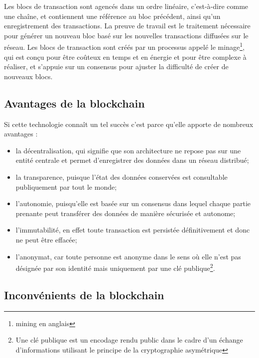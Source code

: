 \documentclass{tnreport}
\begin{document}
Les blocs de transaction sont agencés dans un ordre linéaire, c'est-à-dire comme une chaîne, et contiennent une référence au bloc précédent, ainsi qu'un enregistrement des transactions.
La preuve de travail est le traitement nécessaire pour générer un nouveau bloc basé sur les nouvelles transactions diffusées sur le réseau.
Les blocs de transaction sont créés par un processus appelé le minage\footnote{mining en anglais}, qui est conçu pour être coûteux en temps et en énergie et pour être complexe à réaliser, et s'appuie sur un consensus pour ajuster la difficulté de créer de nouveaux blocs.

\subsection{Avantages de la blockchain}

Si cette technologie connaît un tel succès c'est parce qu'elle apporte de nombreux avantages : 
\begin{itemize}
	\item la décentralisation, qui signifie que son architecture ne repose pas sur une entité centrale et permet d'enregistrer des données dans un réseau distribué; 
	\item la transparence, puisque l'état des données conservées est consultable publiquement par tout le monde; 
	\item l'autonomie, puisqu'elle est basée sur un consensus dans lequel chaque partie prenante peut transférer des données de manière sécurisée et autonome;
	\item l'immutabilité, en effet toute transaction est persistée définitivement et donc ne peut être effacée;
	\item l'anonymat, car toute personne est anonyme dans le sens où elle n'est pas désignée par son identité mais uniquement par une clé publique\footnote{Une clé publique est un encodage rendu public dans le cadre d'un échange d'informations utilisant le principe de la cryptographie asymétrique}.
\end{itemize}

\subsection{Inconvénients de la blockchain}
\end{document}
